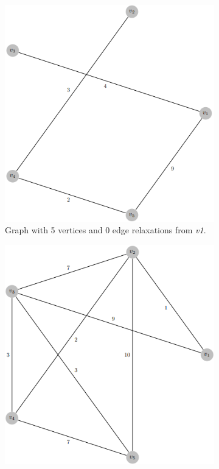\documentclass{l4proj}
\begin{document}
\begin{figure}
    \centering
    \begin{subfigure}[b]{0.49\textwidth}
        \includegraphics[width=\textwidth]{images/0relax.png}
        \caption{Graph with 5 vertices and 0 edge relaxations from \emph{v1}.}
        \label{fig:0rel}
    \end{subfigure}
    \begin{subfigure}[b]{0.49\textwidth}
        \includegraphics[width=\textwidth]{images/4relax.png}

\end{subfigure}
\end{figure}
\end{document}
